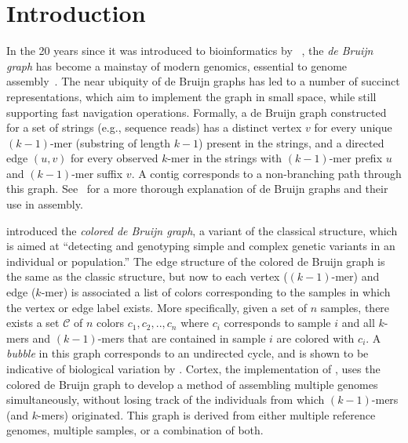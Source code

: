 
\section{Introduction}

In the 20 years since it was introduced to bioinformatics by ~\cite{IW95}, the {\em de Bruijn graph} has become a mainstay of modern genomics, essential to genome assembly~\citep{Compeau11,sequel,ismb2015}. The near ubiquity of de Bruijn graphs has led to a number of succinct representations, which aim to implement the graph in small space, while still supporting fast navigation operations.  Formally, a de Bruijn graph constructed for a set of strings (e.g., sequence reads) has a distinct vertex $v$ for every unique $(k - 1)$-mer (substring of length $k - 1$) present in the strings, and a directed edge $(u, v)$ for every observed $k$-mer in the strings with $(k - 1)$-mer prefix $u$ and $(k - 1)$-mer suffix $v$. A contig corresponds to a non-branching path through this graph. See~\citep{Compeau11} for a more thorough explanation of de Bruijn graphs and their use in assembly. 

\cite{ICTFM12} introduced the {\em colored de Bruijn graph}, a variant of the classical structure, which is aimed at ``detecting and genotyping simple and complex genetic variants in an individual or population.'' The edge structure of the colored de Bruijn graph is the same as the classic structure, but now to each vertex ($(k - 1)$-mer) and edge ($k$-mer)
is associated a list of colors corresponding to the samples in which the vertex or edge label exists. More specifically, given a set of $n$ samples, there exists a set $\mathcal{C}$ of $n$ colors $c_1, c_2, .., c_n$ where $c_i$ corresponds to sample $i$ and all $k$-mers and $(k-1)$-mers that are contained in sample $i$ are colored with $c_i$. A {\em bubble} in this graph corresponds to an undirected cycle, and is shown to be indicative of biological variation by \cite{ICTFM12}. 
{\sc Cortex}, the implementation of \cite{ICTFM12}, uses the colored de Bruijn graph to develop a method of assembling multiple genomes simultaneously, without losing track of the individuals from which $(k - 1)$-mers (and $k$-mers) originated. This graph is derived from either multiple reference genomes, multiple samples, or a combination of both.

